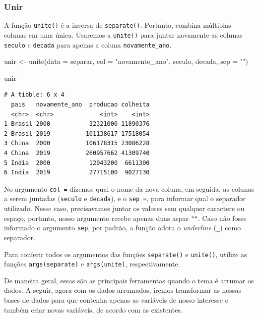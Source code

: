 \documentclass[
  brazilian,
]{book}
\newenvironment{Shaded}{\begin{snugshade}}{\end{snugshade}}
\newcommand{\AttributeTok}[1]{\textcolor[rgb]{0.77,0.63,0.00}{#1}}
\newcommand{\FunctionTok}[1]{\textcolor[rgb]{0.00,0.00,0.00}{#1}}
\newcommand{\NormalTok}[1]{#1}
\newcommand{\OtherTok}[1]{\textcolor[rgb]{0.56,0.35,0.01}{#1}}
\newcommand{\StringTok}[1]{\textcolor[rgb]{0.31,0.60,0.02}{#1}}
\begin{document}
\hypertarget{unir}{%
\subsubsection*{Unir}\label{unir}}

A função \texttt{unite()} é a inversa de \texttt{separate()}. Portanto, combina múltiplas colunas em uma única. Usaremos a \texttt{unite()} para juntar novamente as colunas \texttt{seculo} e \texttt{decada} para apenas a coluna \texttt{novamente\_ano}.

\begin{Shaded}
\begin{Highlighting}[]
\NormalTok{unir }\OtherTok{\textless{}{-}} \FunctionTok{unite}\NormalTok{(}\AttributeTok{data =}\NormalTok{ separar,}
              \AttributeTok{col =} \StringTok{"novamente\_ano"}\NormalTok{,}
\NormalTok{              seculo, decada,}
              \AttributeTok{sep =} \StringTok{""}\NormalTok{)}

\NormalTok{unir}
\end{Highlighting}
\end{Shaded}

\begin{verbatim}
# A tibble: 6 x 4
  pais   novamente_ano  producao colheita
  <chr>  <chr>             <int>    <int>
1 Brasil 2000           32321000 11890376
2 Brasil 2019          101138617 17518054
3 China  2000          106178315 23086228
4 China  2019          260957662 41309740
5 India  2000           12043200  6611300
6 India  2019           27715100  9027130
\end{verbatim}

No argumento \texttt{col\ =} dizemos qual o nome da nova coluna, em seguida, as colunas a serem juntadas (\texttt{seculo} e \texttt{decada}), e o \texttt{sep\ =}, para informar qual o separador utilizado. Nesse caso, precisavamos juntar os valores sem qualquer caractere ou espaço, portanto, nosso argumento recebe apenas duas aspas \texttt{""}. Caso não fosse informado o argumento \texttt{sep}, por padrão, a função adota o \emph{underline} (\texttt{\_}) como separador.

Para conferir todos os argumentos das funções \texttt{separate()} e \texttt{unite()}, utilize as funções \texttt{args(separate)} e \texttt{args(unite)}, respectivamente.

De maneira geral, essas são as principais ferramentas quando o tema é arrumar os dados. A seguir, agora com os dados arrumados, iremos transformar as nossas bases de dados para que contenha apenas as variáveis de nosso interesse e também criar novas variáveis, de acordo com as existentes.
\end{document}
